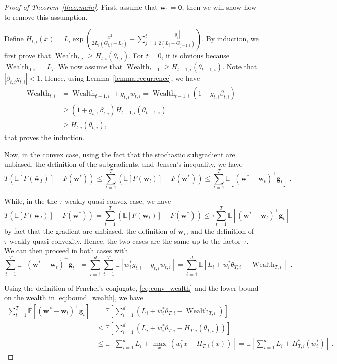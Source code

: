 \documentclass{article}
\newcommand{\bg}{\boldsymbol{g}}
\newcommand{\bw}{\boldsymbol{w}}
\DeclareMathOperator{\Wealth}{Wealth}
\newcommand{\field}[1]{\mathbb{#1}}
\newcommand{\E}{\field{E}}
\begin{document}
\begin{proof}[Proof of Theorem~\ref{theo:main}]
First, assume that $\bw_1=\boldsymbol{0}$, then we will show how to remove this assumption.

Define $H_{t,i}(x)=L_i \exp\left(\frac{x^2}{2 L_i (G_{t,i}+L_i)}- \sum_{j=1}^{t} \frac{|g_j|}{2 (L_i+G_{j-1,i})}\right)$.
By induction, we first prove that $\Wealth_{t,i}\geq H_{t,i}(\theta_{t,i})$. For $t=0$, it is obvious because $\Wealth_{0,i}=L_i$. We now assume that $\Wealth_{t-1}\geq H_{t-1,i}(\theta_{t-1,i})$. Note that $|\beta_{t,i} g_{t,i}|<1$.
Hence, using Lemma~\ref{lemma:recurrence}, we have
\begin{equation}
\label{eq:bound_wealth}
\begin{split}
\Wealth_{t,i}
&=\Wealth_{t-1,i} + g_{t,i} w_{t,i} 
= \Wealth_{t-1,i}(1 + g_{t,i} \beta_{t,i}) \\
&\geq (1 + g_{t,1} \beta_{t,i}) H_{t-1,i}(\theta_{t-1,i}) \\
&\geq H_{t,i}(\theta_{t,i}),
\end{split}
\end{equation}
that proves the induction.

Now, in the convex case, using the fact that the stochastic subgradient are unbiased, the definition of the subgradients, and Jensen's inequality, we have
\begin{equation*}
T \left(\E[F(\bar{\bw}_T)] - F(\bw^*)\right) 
\leq \sum_{t=1}^T (\E[F(\bw_t)] - F(\bw^*)) 
\leq \sum_{t=1}^T \E[(\bw^* - \bw_{t})^\top \bg_{t}]~.
\end{equation*}

While, in the the $\tau$-weakly-quasi-convex case, we have
\[
T \left(\E[F(\bw_I)] - F(\bw^*)\right) 
= \sum_{t=1}^T \left( \E[F(\bw_t)] -F(\bw^*)\right)
\leq \tau \sum_{t=1}^T \E[(\bw^* - \bw_{t})^\top \bg_{t}]
\]
by fact that the gradient are unbiased, the definition of $\bw_I$, and the definition of $\tau$-weakly-quasi-convexity.
Hence, the two cases are the same up to the factor $\tau$. We can then proceed in both cases with
\begin{equation}
\sum_{t=1}^T \E[(\bw^* - \bw_{t})^\top \bg_{t}] 
= \sum_{i=1}^d \sum_{t=1}^T \E[w^*_i g_{t,i} - g_{t,i} w_{t,i} ]
= \sum_{i=1}^d \E[L_i + w^*_i \theta_{T,i} -  \Wealth_{T,i}]~. \label{eq:conv_wealth}
\end{equation}

Using the definition of Fenchel's conjugate, \eqref{eq:conv_wealth} and the lower bound on the wealth in \eqref{eq:bound_wealth}, we have
\begin{align*}
\sum_{t=1}^T \E[(\bw^* - \bw_{t})^\top \bg_{t}] 
&= \E\left[\sum_{i=1}^d (L_i + w^*_i \theta_{T,i} -  \Wealth_{T,i})\right] \\
&\leq \E\left[\sum_{i=1}^d (L_i + w^*_i \theta_{T,i} -  H_{T,i}(\theta_{T,i}))\right]\\
&\leq \E\left[\sum_{i=1}^d L_i+\max_{x} \ (w^*_i x -  H_{T,i}(x))\right]
= \E\left[\sum_{i=1}^d L_i+H^*_{T,i}(w^*_i)\right]~.
\end{align*}


\end{proof}
\end{document}
